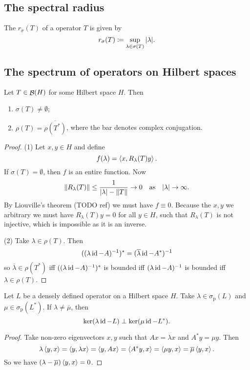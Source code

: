 \subsection{The spectral radius}
\begin{definition}
The  $r_\sigma(T)$ of a operator $T$ is given by
\[ r_\sigma(T) \coloneqq \sup_{\lambda\in\sigma(T)}|\lambda|. \]
\end{definition}


\subsection{The spectrum of operators on Hilbert spaces}
\begin{proposition}
Let $T \in \mathop{\mathcal{B}}(H)$ for some Hilbert space $H$. Then
\begin{enumerate}
\item $\sigma(T) \neq \emptyset$;
\item $\rho(T) = \overline{\rho(T^*)}$, where the bar denotes complex conjugation.
\end{enumerate}
\end{proposition}
\begin{proof}
(1) Let $x,y\in H$ and define
\[ f(\lambda) = \left\langle x,R_\lambda(T)y \right\rangle. \]
If $\sigma(T) = \emptyset$, then $f$ is an entire function. Now
\[ \lVert R_\lambda(T)\rVert \leq \frac{1}{|\lambda| - \lVert T\rVert} \to 0 \quad\text{as}\quad |\lambda| \to \infty. \]
By Liouville's theorem (TODO ref) we must have $f\equiv 0$. Because the $x,y$ we arbitrary we must have $R_\lambda(T)y = 0$ for all $y\in H$, such that $R_\lambda(T)$ is not injective, which is impossible as it is an inverse.

(2) Take $\lambda\in\rho(T)$. Then
\[ ((\lambda\operatorname{id} - A)^{-1})^* = (\overline{\lambda}\operatorname{id} - A^*)^{-1} \]
so $\overline{\lambda}\in\rho(T^*)$ iff $((\lambda\operatorname{id} - A)^{-1})^*$ is bounded iff $(\lambda\operatorname{id} - A)^{-1}$ is bounded iff $\lambda\in \rho(T)$.
\end{proof}

\begin{lemma} \label{eigenspaceOrthogonalAdjoint}
Let $L$ be a densely defined operator on a Hilbert space $H$. Take $\lambda\in \sigma_\text{p}(L)$ and $\mu\in\sigma_\text{p}(L^*)$. If $\lambda \neq \overline{\mu}$, then
\[ \ker(\lambda\operatorname{id} - L)\perp \ker(\mu\operatorname{id} - L^*). \]
\end{lemma}
\begin{proof}
Take non-zero eigenvectors $x,y$ such that $Ax = \lambda x$ and $A^*y = \mu y$. Then
\[ \lambda \left\langle y,x \right\rangle = \left\langle y,\lambda x \right\rangle = \left\langle y, Ax \right\rangle = \left\langle A^*y,x \right\rangle = \left\langle \mu y,x \right\rangle = \overline{\mu}\left\langle y,x \right\rangle. \]
So we have $(\lambda - \overline{\mu})\left\langle y,x \right\rangle = 0$.
\end{proof}

